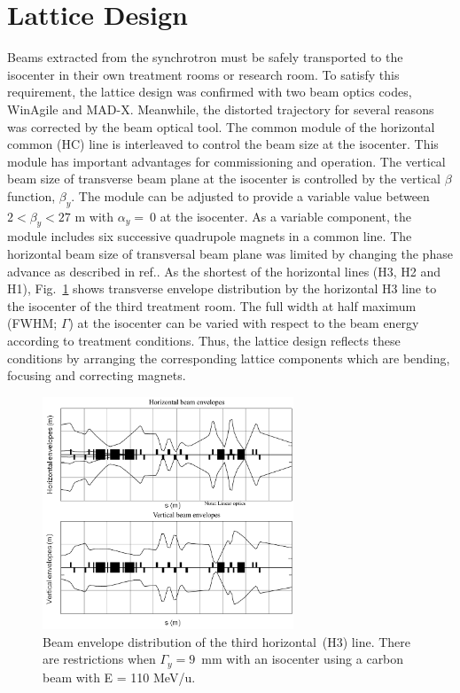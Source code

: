 \documentclass[jkps,preprint,fleqn,showpacs,showkeys]{revtex4}
\begin{document}
\section{Lattice Design}
\label{sec:Lat}
Beams extracted from the synchrotron must be safely transported to the isocenter in their own treatment rooms or research room.
To satisfy this requirement, the lattice design was confirmed with two beam optics codes, WinAgile\cite{Agile0,Agile1} and MAD-X\cite{Schmidt}.
Meanwhile, the distorted trajectory for several reasons was corrected by the beam optical tool\cite{Chawon}.
The common module of the horizontal common (HC) line is interleaved to control the beam size at the isocenter.
This module has important advantages for commissioning and operation. 
The vertical beam size of transverse beam plane at the isocenter is controlled by the vertical $\beta$ function, $\beta_{y}$.  
The module can be adjusted to provide a variable value between $2 < \beta_{y} < 27$ m with $\alpha_{y} = ~0$ at the isocenter. 
As a variable component, the module includes six successive quadrupole magnets in a common line.
The horizontal beam size of transversal beam plane was limited by changing the phase advance as described in ref.\cite{Chawon}. 
As the shortest of the horizontal lines (H3, H2 and H1), 
Fig.~\ref{fig1} shows transverse envelope distribution by the horizontal H3 line to the isocenter of the third treatment room. 
The full width at half maximum (FWHM; $\Gamma$) at the isocenter can be varied with respect to the beam energy according to treatment conditions.
Thus, the lattice design reflects these conditions by arranging the corresponding lattice components which are bending, focusing and correcting magnets.
\begin{figure}[h]
  \begin{center}
    \includegraphics[width=7.5cm]{Fig02.png}  
    \caption{Beam envelope distribution of the third horizontal~(H3) line.
      There are restrictions when $\Gamma_{y} = 9$~mm with an isocenter using a carbon beam with E = 110 MeV/u.}
    \label{fig1}
  \end{center}
\end{figure}
\end{document}

